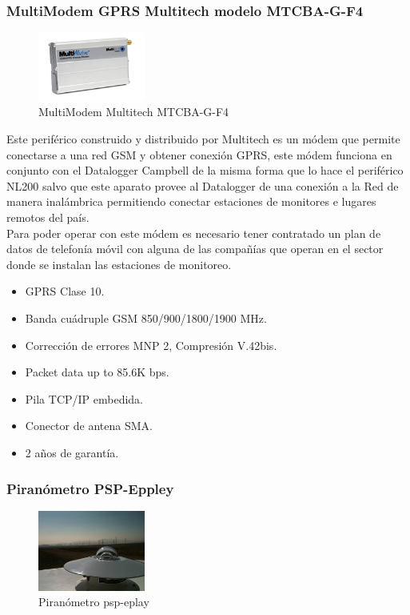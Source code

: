 \subsubsection{MultiModem GPRS Multitech modelo MTCBA-G-F4}

\begin{figure}[h!]
        \centering
        \includegraphics[width=100pt]{images/MultiModemGPRS}
        \caption{MultiModem Multitech MTCBA-G-F4} 
\end{figure}

Este periférico construido y distribuido por Multitech es un módem que permite conectarse a una red GSM y obtener conexión GPRS, este módem funciona en conjunto con el Datalogger Campbell de la misma forma que lo hace el periférico NL200 salvo que este aparato provee al Datalogger de una conexión a la Red de manera inalámbrica permitiendo conectar estaciones de monitores e lugares remotos del país.\\
Para poder operar con este módem es necesario tener contratado un plan de datos de telefonía móvil con alguna de las compañías que operan en el sector donde se instalan las estaciones de monitoreo.

\begin{itemize}
\item GPRS Clase 10.
\item Banda cuádruple GSM 850/900/1800/1900 MHz.
\item Corrección de errores MNP 2, Compresión V.42bis.
\item Packet data up to 85.6K bps.
\item Pila TCP/IP embedida.
\item Conector de antena SMA.
\item 2 años de garantía.
\end{itemize}

\subsubsection{Piranómetro PSP-Eppley}

\begin{figure}[h!]
        \centering
        \includegraphics[width=100pt]{images/piranometro}
        \caption{Piranómetro psp-eplay} 
\end{figure}


